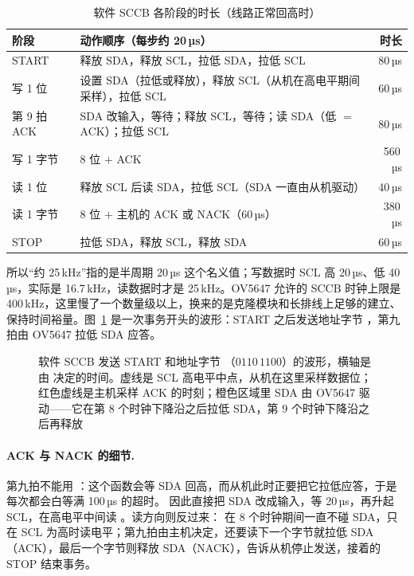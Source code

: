 \begin{table}[htbp]
  \centering
  \caption{软件 SCCB 各阶段的时长（线路正常回高时）}
  \label{tab:sccb-timing}
  \small
  \begin{tabularx}{\linewidth}{@{}lXr@{}}
    \toprule
    阶段 & 动作顺序（每步约 20\,µs） & 时长 \\
    \midrule
    START & 释放 SDA，释放 SCL，拉低 SDA，拉低 SCL & 80\,µs \\
    写 1 位 & 设置 SDA（拉低或释放），释放 SCL（从机在高电平期间采样），拉低 SCL & 60\,µs \\
    第 9 拍 ACK & SDA 改输入，等待；释放 SCL，等待；读 SDA（低 $=$ ACK）；拉低 SCL & 80\,µs \\
    写 1 字节 & 8 位 $+$ ACK & 560\,µs \\
    读 1 位 & 释放 SCL 后读 SDA，拉低 SCL（SDA 一直由从机驱动） & 40\,µs \\
    读 1 字节 & 8 位 $+$ 主机的 ACK 或 NACK（60\,µs） & 380\,µs \\
    STOP & 拉低 SDA，释放 SCL，释放 SDA & 60\,µs \\
    \bottomrule
  \end{tabularx}
\end{table}

所以“约 25\,kHz”指的是半周期 20\,µs 这个名义值；写数据时 SCL 高 20\,µs、低 40\,µs，实际是 16.7\,kHz，读数据时才是 25\,kHz。OV5647 允许的 SCCB 时钟上限是 400\,kHz，这里慢了一个数量级以上，换来的是克隆模块和长排线上足够的建立、保持时间裕量。图~\ref{fig:sccb-wave} 是一次事务开头的波形：START 之后发送地址字节 ，第九拍由 OV5647 拉低 SDA 应答。

\begin{figure}[htbp]
  \centering
  
  \caption{软件 SCCB 发送 START 和地址字节 （$0110\,1100$）的波形，横轴是由  决定的时间。虚线是 SCL 高电平中点，从机在这里采样数据位；红色虚线是主机采样 ACK 的时刻；橙色区域里 SDA 由 OV5647 驱动——它在第 8 个时钟下降沿之后拉低 SDA，第 9 个时钟下降沿之后再释放}
  \label{fig:sccb-wave}
\end{figure}

\paragraph{ACK 与 NACK 的细节.} 第九拍不能用 ：这个函数会等 SDA 回高，而从机此时正要把它拉低应答，于是每次都会白等满 100\,µs 的超时。 因此直接把 SDA 改成输入，等 20\,µs，再升起 SCL，在高电平中间读 。读方向则反过来： 在 8 个时钟期间一直不碰 SDA，只在 SCL 为高时读电平；第九拍由主机决定，还要读下一个字节就拉低 SDA（ACK），最后一个字节则释放 SDA（NACK），告诉从机停止发送，接着的 STOP 结束事务。

